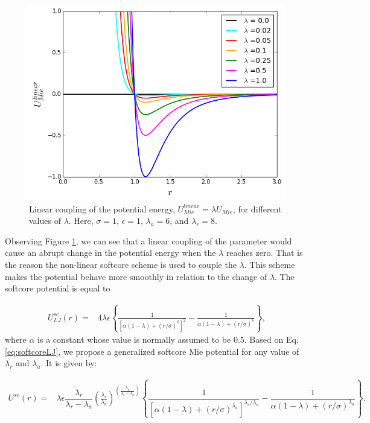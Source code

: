 \begin{figure}[H]
	\centering
	\includegraphics[width=0.8\linewidth]{Figures/linear8}
	\caption{Linear coupling of the potential energy, $U^{linear}_{Mie} = \lambda U_{Mie}$, for different values of $\lambda$. Here, $\sigma=1$, $\epsilon=1$, $\lambda _a = 6$, and $\lambda _r = 8$.}
	\label{fig:linearpoten}
\end{figure} 

Observing Figure \ref{fig:linearpoten}, we can see that a linear coupling of the parameter would cause an abrupt change in the potential energy when the $\lambda$ reaches zero. That is the reason the non-linear softcore scheme \cite{beutler1994} is used to couple the $\lambda$. This scheme makes the potential behave more smoothly in relation to the change of $\lambda$. The softcore potential is equal to

\begin{equation}
\label{eq:softcoreLJ}
\begin{aligned}
U_{LJ}^{sc}(r) {}=& 4\lambda\epsilon \left\lbrace\frac{1}{\left[\alpha(1-\lambda)+ (r/\sigma)^{6}\right]^{2}} - \frac{1}{\alpha(1-\lambda)+(r/\sigma)^{6}}\right\rbrace ,
\end{aligned}
\end{equation}
where $\alpha$ is a constant whose value is  normally assumed to be 0.5.    Based on Eq. \ref{eq:softcoreLJ}, we propose a generalized softcore Mie potential for any value of $\lambda _{r}$ and $\lambda _{a}$. It is given by:

\begin{equation}
\label{eq:softcore}
\begin{aligned}
U^{sc}(r) {}=& \lambda\epsilon\dfrac{\lambda_r}{\lambda_r - \lambda_a} \left(\frac{\lambda_r}{\lambda_a} \right)^{\left( \frac{\lambda_a}{\lambda_r - \lambda_a} \right)} \left\lbrace\dfrac{1}{\left[\alpha(1-\lambda)+ (r/\sigma)^{\lambda_a}\right]^{\lambda_{r}/\lambda_{a}}} - \dfrac{1}{\alpha(1-\lambda)+(r/\sigma)^{\lambda_a}}\right\rbrace .
\end{aligned}
\end{equation}

